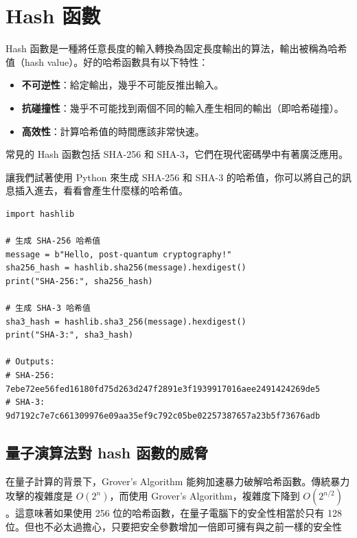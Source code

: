 \documentclass[
]{article}
\author{}
\date{}
\providecommand{\tightlist}{%
  \setlength{\itemsep}{0pt}\setlength{\parskip}{0pt}}
\begin{document}
\hypertarget{hash-ux51fdux6578}{%
\section{Hash 函數}\label{hash-ux51fdux6578}}

Hash
函數是一種將任意長度的輸入轉換為固定長度輸出的算法，輸出被稱為哈希值（hash
value）。好的哈希函數具有以下特性：

\begin{itemize}
\tightlist
\item
  \textbf{不可逆性}：給定輸出，幾乎不可能反推出輸入。
\item
  \textbf{抗碰撞性}：幾乎不可能找到兩個不同的輸入產生相同的輸出（即哈希碰撞）。
\item
  \textbf{高效性}：計算哈希值的時間應該非常快速。
\end{itemize}

常見的 Hash 函數包括 SHA-256 和 SHA-3，它們在現代密碼學中有著廣泛應用。

讓我們試著使用 Python 來生成 SHA-256 和 SHA-3
的哈希值，你可以將自己的訊息插入進去，看看會產生什麼樣的哈希值。

\begin{verbatim}
import hashlib

# 生成 SHA-256 哈希值
message = b"Hello, post-quantum cryptography!"
sha256_hash = hashlib.sha256(message).hexdigest()
print("SHA-256:", sha256_hash)

# 生成 SHA-3 哈希值
sha3_hash = hashlib.sha3_256(message).hexdigest()
print("SHA-3:", sha3_hash)

# Outputs:
# SHA-256: 7ebe72ee56fed16180fd75d263d247f2891e3f1939917016aee2491424269de5
# SHA-3: 9d7192c7e7c661309976e09aa35ef9c792c05be02257387657a23b5f73676adb
\end{verbatim}

\hypertarget{ux91cfux5b50ux6f14ux7b97ux6cd5ux5c0d-hash-ux51fdux6578ux7684ux5a01ux8105}{%
\subsection{量子演算法對 hash
函數的威脅}\label{ux91cfux5b50ux6f14ux7b97ux6cd5ux5c0d-hash-ux51fdux6578ux7684ux5a01ux8105}}

在量子計算的背景下，Grover's Algorithm
能夠加速暴力破解哈希函數。傳統暴力攻擊的複雜度是 \(O(2^n)\)，而使用
Grover's Algorithm，複雜度下降到 \(O(2^{n/2})\)。這意味著如果使用 256
位的哈希函數，在量子電腦下的安全性相當於只有 128
位。但也不必太過擔心，只要把安全參數增加一倍即可擁有與之前一樣的安全性
\end{document}
